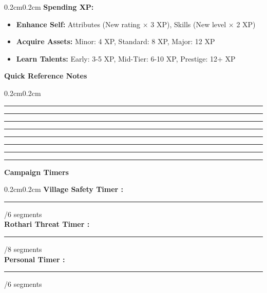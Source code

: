 \documentclass[10pt]{article}
\begin{document}
\begin{mdframed}[backgroundcolor=background, linewidth=0pt]
\begin{adjustwidth}{0.2cm}{0.2cm}
\textbf{Spending XP:}
\begin{itemize}[leftmargin=*]
\item \textbf{Enhance Self:} Attributes (New rating × 3 XP), Skills (New level × 2 XP)
\item \textbf{Acquire Assets:} Minor: 4 XP, Standard: 8 XP, Major: 12 XP
\item \textbf{Learn Talents:} Early: 3-5 XP, Mid-Tier: 6-10 XP, Prestige: 12+ XP
\end{itemize}
\end{adjustwidth}

\vspace{0.3cm}

\begin{mdframed}[backgroundcolor=sectionbg, linewidth=1pt, linecolor=accentcolor]
\textbf{\large Quick Reference Notes}
\end{mdframed}

\begin{adjustwidth}{0.2cm}{0.2cm}
\vspace{0.2cm}
\rule{\textwidth-0.4cm}{0.4pt}
\rule{\textwidth-0.4cm}{0.4pt}
\rule{\textwidth-0.4cm}{0.4pt}
\rule{\textwidth-0.4cm}{0.4pt}
\rule{\textwidth-0.4cm}{0.4pt}
\rule{\textwidth-0.4cm}{0.4pt}
\rule{\textwidth-0.4cm}{0.4pt}
\rule{\textwidth-0.4cm}{0.4pt}
\end{adjustwidth}

\vspace{0.5cm}

\begin{mdframed}[backgroundcolor=sectionbg, linewidth=1pt, linecolor=accentcolor]
\textbf{\large Campaign Timers}
\end{mdframed}

\begin{adjustwidth}{0.2cm}{0.2cm}
\vspace{0.2cm}
\textbf{Village Safety Timer :} \rule{3cm}{0.4pt}/6 segments \\
\textbf{Rothari Threat Timer :} \rule{3cm}{0.4pt}/8 segments \\
\textbf{Personal Timer :} \rule{3cm}{0.4pt}/6 segments \\
\end{adjustwidth}

\end{mdframed}

\end{document}
